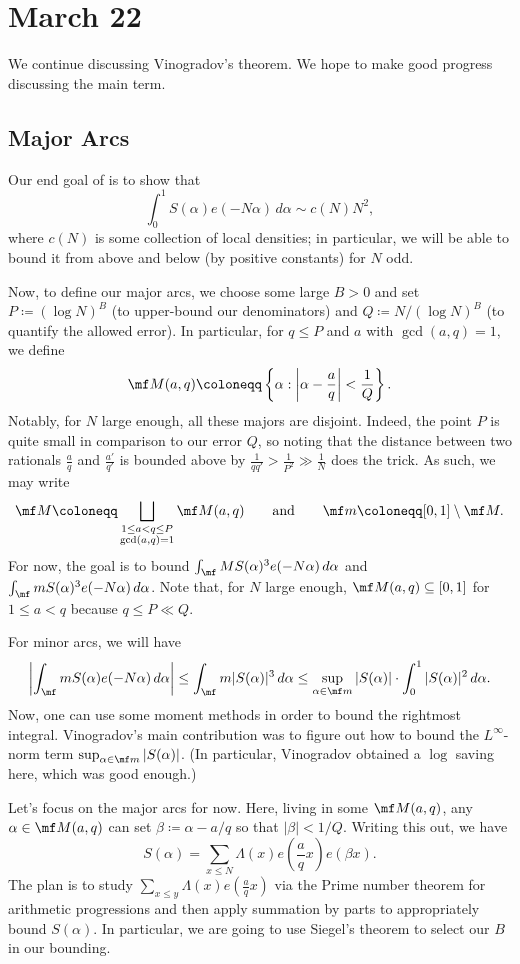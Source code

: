 \documentclass[../notes.tex]{subfiles}
\begin{document}
\section{March 22}

We continue discussing Vinogradov's theorem. We hope to make good progress discussing the main term.

\subsection{Major Arcs}
Our end goal of is to show that
\[\int_0^1S(\alpha)e(-N\alpha)\,d\alpha\sim c(N)N^2,\]
where $c(N)$ is some collection of local densities; in particular, we will be able to bound it from above and below (by positive constants) for $N$ odd.

Now, to define our major arcs, we choose some large $B>0$ and set $P\coloneqq(\log N)^B$ (to upper-bound our denominators) and $Q\coloneqq N/(\log N)^B$ (to quantify the allowed error). In particular, for $q\le P$ and $a$ with $\gcd(a,q)=1$, we define
\[\mf M(a,q)\coloneqq\left\{\alpha:\left|\alpha-\frac aq\right|<\frac1Q\right\}.\]
Notably, for $N$ large enough, all these majors are disjoint. Indeed, the point $P$ is quite small in comparison to our error $Q$, so noting that the distance between two rationals $\frac aq$ and $\frac{a'}{q'}$ is bounded above by $\frac1{qq'}>\frac1{P^2}\gg\frac1N$ does the trick. As such, we may write
\[\mf M\coloneqq\bigsqcup_{\substack{1\le a<q\le P\\\gcd(a,q)=1}}\mf M(a,q)\qquad\text{and}\qquad\mf m\coloneqq[0,1]\setminus\mf M.\]
For now, the goal is to bound $\int_\mf MS(\alpha)^3e(-N\alpha)\,d\alpha$ and $\int_\mf mS(\alpha)^3e(-N\alpha)\,d\alpha$. Note that, for $N$ large enough, $\mf M(a,q)\subseteq[0,1]$ for $1\le a<q$ because $q\le P\ll Q$.
\begin{remark}
	For minor arcs, we will have
	\[\left|\int_\mf mS(\alpha)e(-N\alpha)\,d\alpha\right| \le\int_\mf m|S(\alpha)|^3\,d\alpha\le \sup_{\alpha\in\mf m}|S(\alpha)|\cdot\int_0^1|S(\alpha)|^2\,d\alpha.\]
	Now, one can use some moment methods in order to bound the rightmost integral. Vinogradov's main contribution was to figure out how to bound the $L^\infty$-norm term $\sup_{\alpha\in\mf m}|S(\alpha)|$. (In particular, Vinogradov obtained a $\log$ saving here, which was good enough.)
\end{remark}
Let's focus on the major arcs for now. Here, living in some $\mf M(a,q)$, any $\alpha\in\mf M(a,q)$ can set $\beta\coloneqq\alpha-a/q$ so that $|\beta|<1/Q$. Writing this out, we have
\[S(\alpha)=\sum_{x\le N}\Lambda(x)e\left(\frac aqx\right)e(\beta x).\]
The plan is to study $\sum_{x\le y}\Lambda(x)e\left(\frac aqx\right)$ via the Prime number theorem for arithmetic progressions and then apply summation by parts to appropriately bound $S(\alpha)$. In particular, we are going to use Siegel's theorem to select our $B$ in our bounding.
\end{document}

